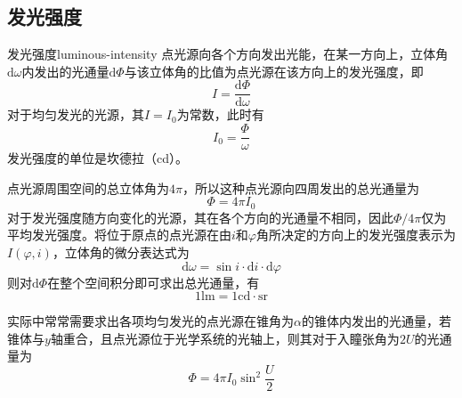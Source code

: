 \documentclass[cn,10pt,chinesefont=founder,math=newtx,cite=super,twoside]{elegantbook}
\begin{document}
\subsection{发光强度}
\begin{definition}{发光强度}{luminous-intensity}
点光源向各个方向发出光能，在某一方向上，立体角$\mathrm{d}\omega$内发出的光通量$\mathrm{d}\varPhi$与该立体角的比值为点光源在该方向上的发光强度，即
\begin{equation}
I=\frac{\mathrm{d}\varPhi}{\mathrm{d}\omega}
\end{equation}
对于均匀发光的光源，其$I=I_0$为常数，此时有
\begin{equation}
I_0=\frac{\varPhi}{\omega}
\end{equation}
发光强度的单位是坎德拉（cd）。
\end{definition}
点光源周围空间的总立体角为$4\pi$，所以这种点光源向四周发出的总光通量为
\begin{equation}
\varPhi=4\pi I_0
\end{equation}
对于发光强度随方向变化的光源，其在各个方向的光通量不相同，因此$\varPhi/4\pi$仅为平均发光强度。将位于原点的点光源在由$i$和$\varphi$角所决定的方向上的发光强度表示为$I(\varphi,i)$，立体角的微分表达式为
\begin{equation}
\mathrm{d}\omega=\sin i\cdot\mathrm{d}i\cdot\mathrm{d}\varphi
\end{equation}
则对$\mathrm{d}\varPhi$在整个空间积分即可求出总光通量，有
\begin{equation}
1\mathrm{lm}=1\mathrm{cd}\cdot\mathrm{sr}
\end{equation}
\begin{note}
	实际中常常需要求出各项均匀发光的点光源在锥角为$\alpha$的锥体内发出的光通量，若锥体与$y$轴重合，且点光源位于光学系统的光轴上，则其对于入瞳张角为$2U$的光通量为
	\begin{equation}
	\varPhi=4\pi I_0\sin^2\frac{U}{2}
	\end{equation}
\end{note}
\end{document}
